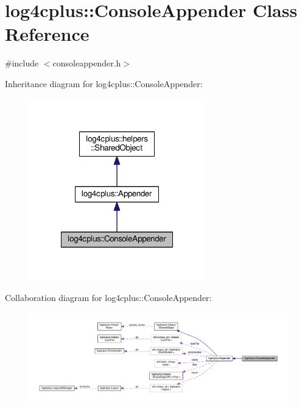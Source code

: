 \hypertarget{classlog4cplus_1_1ConsoleAppender}{\section{log4cplus\-:\-:Console\-Appender Class Reference}
\label{classlog4cplus_1_1ConsoleAppender}
}


{\ttfamily \#include $<$consoleappender.\-h$>$}



Inheritance diagram for log4cplus\-:\-:Console\-Appender\-:
\nopagebreak
\begin{figure}[H]
\begin{center}
\leavevmode
\includegraphics[width=216pt]{classlog4cplus_1_1ConsoleAppender__inherit__graph}
\end{center}
\end{figure}


Collaboration diagram for log4cplus\-:\-:Console\-Appender\-:
\nopagebreak
\begin{figure}[H]
\begin{center}
\leavevmode
\includegraphics[width=350pt]{classlog4cplus_1_1ConsoleAppender__coll__graph}
\end{center}
\end{figure}
